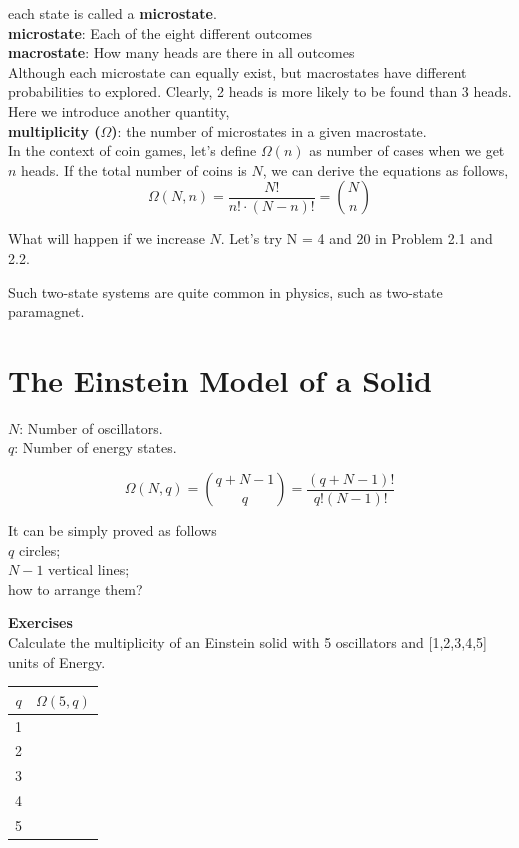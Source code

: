 each state is called a {\bf microstate}.\\
{\bf microstate}: Each of the eight different outcomes\\
{\bf macrostate}: How many heads are there in all outcomes\\

Although each microstate can equally exist, but macrostates have different probabilities to explored.
Clearly, 2 heads is more likely to be found than 3 heads.
Here we introduce another quantity,\\
{\bf multiplicity ($\Omega$)}: the number of microstates in a given macrostate.\\

In the context of coin games, let's define $\Omega(n)$ as number of cases when we get $n$ heads.
If the total number of coins is $N$, we can derive the equations as follows,
\begin{equation}
 \Omega(N, n) = \frac{N!}{n!\cdot(N-n)!} = \binom{N}{n} 
\end{equation}

What will happen if we increase $N$. Let's try N = 4 and 20 in Problem 2.1 and 2.2.


Such two-state systems are quite common in physics, such as two-state paramagnet.

\section{The Einstein Model of a Solid}
$N$: Number of oscillators.\\
$q$: Number of energy states.

\begin{equation}
 \Omega(N, q) = \binom{q+N-1}{q} = \frac{(q+N-1)!}{q!(N-1)!}
\end{equation}

It can be simply proved as follows\\
$q$ circles; \\
$N-1$ vertical lines;\\
how to arrange them? \\

{\bf Exercises}\\
Calculate the multiplicity of an Einstein solid with 5 oscillators and [1,2,3,4,5] units of Energy.\\
\begin{tabular}{c|c }
$q$ &$\Omega(5,q)$ \\\hline
 1     &  \\
 2     &  \\
 3     &  \\
 4     &  \\
 5     &  \\\hline
\end{tabular}

